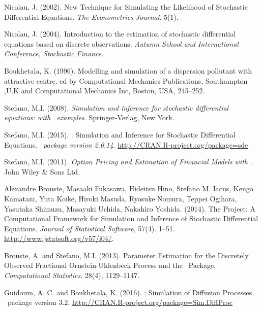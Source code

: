 \begin{thebibliography}{1}
Nicolau, J. (2002).
\newblock New Technique for Simulating the Likelihood of Stochastic Differential Equations.
\newblock \emph{The Econometrics Journal}. 5(1).

Nicolau, J. (2004).
\newblock  Introduction to the estimation of stochastic differential equations based on discrete observations.
\newblock  \emph{Autumn School and International Conference, Stochastic Finance}.

Boukhetala, K. (1996).
\newblock Modelling and simulation of a dispersion pollutant with attractive centre.
\newblock ed by Computational Mechanics Publications, Southampton ,U.K and Computational Mechanics Inc, Boston, USA, 245--252.

Stefano, M.I. (2008).
\newblock \emph{Simulation and inference for stochastic differential equations: with \R~examples}.
\newblock Springer-Verlag, New York.

Stefano, M.I. (2015).
\newblock {}: Simulation and Inference for Stochastic Differential Equations.
\newblock \emph{\R~package version 2.0.14}.
\newblock \url{http://CRAN.R-project.org/package=sde}

Stefano, M.I. (2011).
\newblock \emph{Option Pricing and Estimation of Financial Models with \R}.
\newblock John Wiley \& Sons Ltd.

Alexandre Brouste, Masaaki Fukasawa, Hideitsu Hino, Stefano M. Iacus, Kengo Kamatani, Yuta Koike, Hiroki Masuda, Ryosuke Nomura, Teppei Ogihara, Yasutaka Shimuzu, Masayuki Uchida, Nakahiro Yoshida. (2014).
\newblock The  Project: A Computational Framework for Simulation and Inference of Stochastic Differential Equations.
\newblock \emph{Journal of Statistical Software}, 57(4). 1--51.
\newblock \url{http://www.jstatsoft.org/v57/i04/}.

Brouste, A. and Stefano, M.I. (2013).
\newblock Parameter Estimation for the Discretely Observed Fractional Ornstein-Uhlenbeck Process and the  \R~Package.
\newblock \emph{Computational Statistics}. 28(4), 1129--1147.

Guidoum, A. C. and Boukhetala, K. (2016).
\newblock {}: Simulation of Diffusion Processes.
\newblock \R~package version 3.2.
\newblock \url{http://CRAN.R-project.org/package=Sim.DiffProc}


\end{thebibliography}
